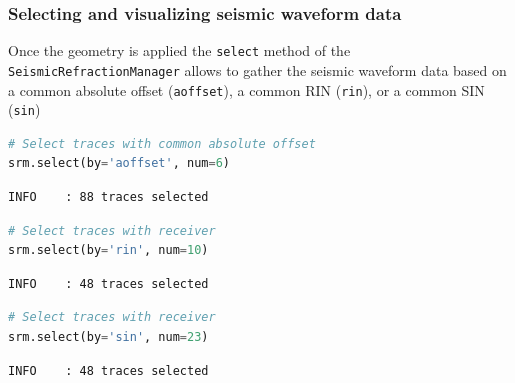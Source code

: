 \documentclass[a4paper,fleqn]{cas-sc}
\begin{document}
\subsubsection{Selecting and visualizing seismic waveform data}
Once the geometry is applied the \texttt{select} method of the \texttt{SeismicRefractionManager} allows to gather the seismic waveform data based on a common absolute offset (\texttt{aoffset}), a common RIN (\texttt{rin}), or a common SIN (\texttt{sin})
\begin{lstlisting}[language=Python, firstnumber=6]
# Select traces with common absolute offset
srm.select(by='aoffset', num=6)
\end{lstlisting}
\begin{footnotesize}
\begin{verbatim}
INFO    : 88 traces selected
\end{verbatim}
\end{footnotesize}
\begin{lstlisting}[language=Python, firstnumber=8]
# Select traces with receiver
srm.select(by='rin', num=10)
\end{lstlisting}
\begin{footnotesize}
\begin{verbatim}
INFO    : 48 traces selected
\end{verbatim}
\end{footnotesize}
\begin{lstlisting}[language=Python, firstnumber=10]
# Select traces with receiver
srm.select(by='sin', num=23)
\end{lstlisting}
\begin{footnotesize}
\begin{verbatim}
INFO    : 48 traces selected
\end{verbatim}
\end{footnotesize}
\end{document}
